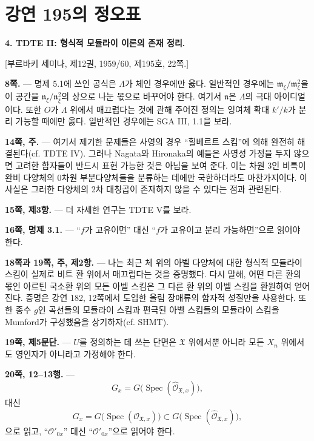 \clearpage
\chapter*{강연 195의 정오표}
\setcounter{footnote}{0}

\noindent\textbf{4. TDTE II: 형식적 모듈라이 이론의 존재 정리.}

\begin{center}
[부르바키 세미나, 제12권, 1959/60, 제195호, 22쪽.]
\end{center}

\noindent\textbf{8쪽.} --- 명제 5.1에 쓰인 공식은 $\Lambda$가 체인
경우에만 옳다. 일반적인 경우에는
$\mathfrak m_\xi/\mathfrak m_\xi^2$을 이 공간을
$\mathfrak n_\xi/\mathfrak n_\xi^2$의 상으로 나눈 몫으로 바꾸어야 한다.
여기서 $\mathfrak n$은 $\Lambda$의 극대 아이디얼이다. 또한 $O$가
$\Lambda$ 위에서 매끄럽다는 것에 관해 주어진 정의는 잉여체 확대 $k'/k$가
분리 가능할 때에만 옳다. 일반적인 경우에는 SGA III, 1.1을 보라.

\noindent\textbf{14쪽, 주.} --- 여기서 제기한 문제들은 사영의 경우
``힐베르트 스킴''에 의해 완전히 해결된다(cf. TDTE IV). 그러나 Nagata와
Hironaka의 예들은 사영성 가정을 두지 않으면 고려한 함자들이 반드시 표현
가능한 것은 아님을 보여 준다. 이는 차원 3인 비특이 완비 다양체의 0차원
부분다양체들을 분류하는 데에만 국한하더라도 마찬가지이다. 이 사실은 그러한
다양체의 2차 대칭곱이 존재하지 않을 수 있다는 점과 관련된다.

\noindent\textbf{15쪽, 제3항.} --- 더 자세한 연구는 TDTE V를 보라.

\noindent\textbf{16쪽, 명제 3.1.} --- ``$f$가 고유이면'' 대신
``$f$가 고유이고 분리 가능하면''으로 읽어야 한다.

\noindent\textbf{18쪽과 19쪽, 주, 제2항.} --- 나는 최근 체 위의 아벨
다양체에 대한 형식적 모듈라이 스킴이 실제로 비트 환 위에서 매끄럽다는 것을
증명했다. 다시 말해, 어떤 다른 환의 몫인 아르틴 국소환 위의 모든 아벨
스킴은 그 다른 환 위의 아벨 스킴을 환원하여 얻어진다. 증명은 강연 182,
12쪽에서 도입한 올림 장애류의 함자적 성질만을 사용한다. 또한 종수 $g$인
곡선들의 모듈라이 스킴과 편극된 아벨 스킴들의 모듈라이 스킴을 Mumford가
구성했음을 상기하자(cf. SHMT).

\noindent\textbf{19쪽, 제5문단.} --- $U$를 정의하는 데 쓰는 단면은
$\mathfrak X$ 위에서뿐 아니라 모든 $X_n$ 위에서도 영인자가 아니라고
가정해야 한다.

\noindent\textbf{20쪽, 12--13행.} ---
\[
  G_x=G\bigl(\operatorname{Spec}(\widehat{\mathcal O}_{\mathfrak X,x})\bigr),
\]
대신
\[
  G_x=G\bigl(\operatorname{Spec}(\mathcal O_{\mathfrak X,x})\bigr)
  \subset
  G\bigl(\operatorname{Spec}(\widehat{\mathcal O}_{\mathfrak X,x})\bigr),
\]
으로 읽고, ``$\mathcal O'_{0x}$'' 대신
``$\widehat{\mathcal O}'_{0x}$''으로 읽어야 한다.
